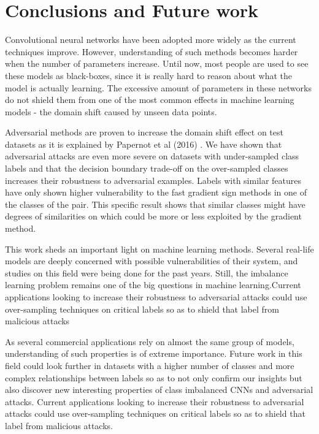 \chapter{Conclusions and Future work} \label{chap:conclusion}
Convolutional neural networks have been adopted more widely as the current techniques improve. However, understanding of such methods becomes harder when the number of parameters increase. Until now, most people  are used to see these models as black-boxes, since it is really hard to reason about what the model is actually learning. The excessive amount of parameters in these networks do not shield them from one of the most common effects in machine learning models - the domain shift caused by unseen data points.

Adversarial methods are proven to increase the domain shift effect on test datasets as it is explained by Papernot et al (2016) \cite{papernot2016transf}. We have shown that adversarial attacks are even more severe on datasets with under-sampled class labels and that the decision boundary trade-off on the over-sampled classes increases their robustness to adversarial examples. Labels with similar features have only shown higher vulnerability to the fast gradient sign methods in one of the classes of the pair. This specific result shows that similar classes might have degrees of similarities on which could be more or less exploited by the gradient method.  

This work sheds an important light on machine learning methods. Several real-life models are deeply concerned with possible vulnerabilities of their system, and studies on this field were being done for the past years. Still, the imbalance learning problem remains one of the big questions in machine learning.Current applications looking to increase their robustness to adversarial attacks could use over-sampling techniques on critical labels so as to shield that label from malicious attacks

As several commercial applications rely on almost the same group of models, understanding of such properties is of extreme importance. Future work in this field could look further in datasets with a higher number of classes and more complex relationships between labels so as to not only confirm our insights but also discover new interesting properties of class imbalanced CNNs and adversarial attacks. Current applications looking to increase their robustness to adversarial attacks could use over-sampling techniques on critical labels so as to shield that label from malicious attacks.